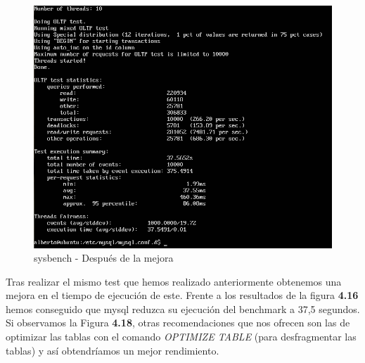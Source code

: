 \begin{figure}[h]
	\centering
	\includegraphics[scale=0.44]{images/despu.png}
	\caption{sysbench - Después de la mejora}
\end{figure} 


Tras realizar el mismo test que hemos realizado anteriormente obtenemos una mejora en el tiempo de ejecución de este.
Frente a los resultados de la figura \textbf{4.16} hemos conseguido que mysql reduzca su ejecución del benchmark a 37,5 segundos. \\


Si observamos la Figura \textbf{4.18}, otras recomendaciones que nos ofrecen son las de optimizar las tablas con el comando \textit{OPTIMIZE TABLE} (para desfragmentar las tablas) y así obtendríamos un mejor rendimiento. 





